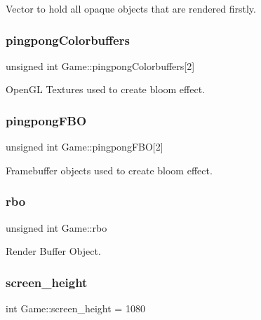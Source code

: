 Vector to hold all opaque objects that are rendered firstly. 

\mbox{\label{class_game_abbb66ef5bda6124f03272970cd18707f}} 
\subsubsection{\texorpdfstring{pingpongColorbuffers}{pingpongColorbuffers}}
{\footnotesize\ttfamily unsigned int Game\+::pingpong\+Colorbuffers\mbox{[}2\mbox{]}\hspace{0.3cm}{\ttfamily [protected]}}



Open\+GL Textures used to create bloom effect. 

\mbox{\label{class_game_a0160418629f882b089847e9ddd6901f5}} 
\subsubsection{\texorpdfstring{pingpongFBO}{pingpongFBO}}
{\footnotesize\ttfamily unsigned int Game\+::pingpong\+F\+BO\mbox{[}2\mbox{]}\hspace{0.3cm}{\ttfamily [protected]}}



Framebuffer objects used to create bloom effect. 

\mbox{\label{class_game_a521e6ba079b5beb2d552137f9363e36e}} 
\subsubsection{\texorpdfstring{rbo}{rbo}}
{\footnotesize\ttfamily unsigned int Game\+::rbo\hspace{0.3cm}{\ttfamily [protected]}}



Render Buffer Object. 

\mbox{\label{class_game_ab52e2343e6335e426a6395c44f4dab71}} 
\subsubsection{\texorpdfstring{screen\_height}{screen\_height}}
{\footnotesize\ttfamily int Game\+::screen\+\_\+height = 1080\hspace{0.3cm}{\ttfamily [protected]}}




